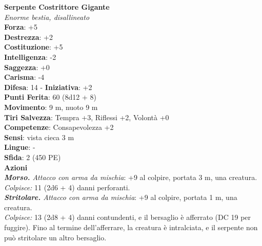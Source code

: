 \begin{multicols}{2}
\medskip\textbf{Serpente Costrittore Gigante}\\
\emph{Enorme bestia, disallineato}\\
\textbf{Forza}: +5\\
\textbf{Destrezza}: +2\\
\textbf{Costituzione}: +5\\
\textbf{Intelligenza}: -2\\
\textbf{Saggezza}: +0\\
\textbf{Carisma}: -4\\
\textbf{Difesa}: 14 - \textbf{Iniziativa}: +2\\
\textbf{Punti Ferita}: 60 (8d12 + 8)\\
\textbf{Movimento}: 9 m, nuoto 9 m\\
\textbf{Tiri Salvezza}: Tempra +3, Riflessi +2, Volontà +0\\
\textbf{Competenze}: Consapevolezza +2\\
\textbf{Sensi}: vista cieca 3 m\\
\textbf{Lingue}: -\\
\textbf{Sfida}: 2 (450 PE)\smallskip\\
\smallskip\textbf{Azioni}\\
\emph{\textbf{Morso.} Attacco con arma da mischia}: +9 al colpire, portata 3 m, una creatura.\\
\emph{Colpisce:} 11 (2d6 + 4) danni perforanti.\\
\emph{\textbf{Stritolare.} Attacco con arma da mischia}: +9 al colpire, portata 1 m, una creatura.\\
\emph{Colpisce:} 13 (2d8 + 4) danni contundenti, e il bersaglio è afferrato (DC  19 per fuggire). Fino al termine dell'afferrare, la creatura è intralciata, e il serpente non può stritolare un altro bersaglio.\\



\end{multicols}
